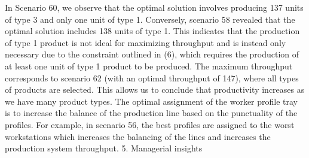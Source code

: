 In Scenario 60, we observe that the optimal solution involves producing 137 units of type 3 and only one unit of type 1. Conversely, scenario 58 revealed that the optimal solution includes 138 units of type 1. This indicates that the production of type 1 product is not ideal for maximizing throughput and is instead only necessary due to the constraint outlined in (6), which requires the production of at least one unit of type 1 product to be produced. The maximum throughput corresponds to scenario 62 (with an optimal throughput of 147), where all types of products are selected. This allows us to conclude that productivity increases as we have many product types. The optimal assignment of the worker profile tray is to increase the balance of the production line based on the punctuality of the profiles. For example, in scenario 56, the best profiles are assigned to the worst workstations which increases the balancing of the lines and increases the production system throughput.
5.	Managerial insights

